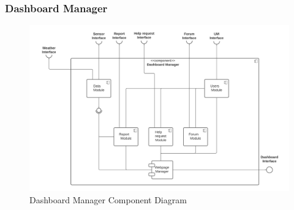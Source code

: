 \documentclass[10pt]{article} %
\begin{document}
\subsubsection{Dashboard Manager}
\begin{figure}[h]
    \centering 
    \includegraphics[scale=0.4]{images/dashboardManager.png}
    \caption{Dashboard Manager Component Diagram}
    \label{fig:dashboard_manager}
\end{figure}
\end{document}
